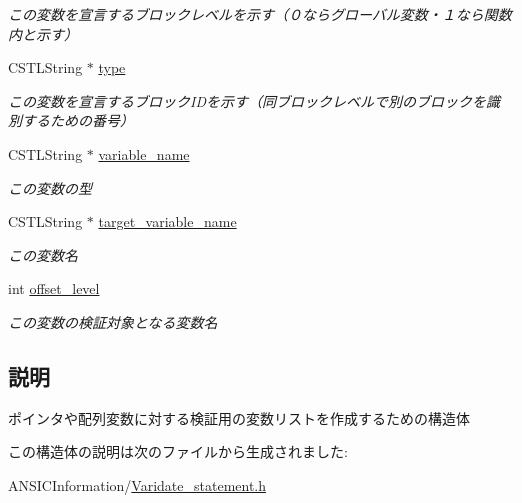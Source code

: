 \begin{DoxyCompactItemize}
\begin{DoxyCompactList}\small\item\em この変数を宣言するブロックレベルを示す（０ならグローバル変数・１なら関数内と示す） \item\end{DoxyCompactList}\item 
CSTLString $\ast$ \hyperlink{structvalidate__variable_a25c2a484b27cf32f5be46d6fda3b8853}{type}\label{structvalidate__variable_a25c2a484b27cf32f5be46d6fda3b8853}

\begin{DoxyCompactList}\small\item\em この変数を宣言するブロックIDを示す（同ブロックレベルで別のブロックを識別するための番号） \item\end{DoxyCompactList}\item 
CSTLString $\ast$ \hyperlink{structvalidate__variable_a2be1b0e38218f7cc1b23644d1a6237ff}{variable\_\-name}\label{structvalidate__variable_a2be1b0e38218f7cc1b23644d1a6237ff}

\begin{DoxyCompactList}\small\item\em この変数の型 \item\end{DoxyCompactList}\item 
CSTLString $\ast$ \hyperlink{structvalidate__variable_aa238dc06f28d558b5bb9ff8732539045}{target\_\-variable\_\-name}\label{structvalidate__variable_aa238dc06f28d558b5bb9ff8732539045}

\begin{DoxyCompactList}\small\item\em この変数名 \item\end{DoxyCompactList}\item 
int \hyperlink{structvalidate__variable_a17d23aaef8047824133aa011d7701810}{offset\_\-level}\label{structvalidate__variable_a17d23aaef8047824133aa011d7701810}

\begin{DoxyCompactList}\small\item\em この変数の検証対象となる変数名 \item\end{DoxyCompactList}\end{DoxyCompactItemize}


\subsection{説明}
ポインタや配列変数に対する検証用の変数リストを作成するための構造体 

この構造体の説明は次のファイルから生成されました:\begin{DoxyCompactItemize}
\item 
ANSICInformation/\hyperlink{Varidate__statement_8h}{Varidate\_\-statement.h}\end{DoxyCompactItemize}
